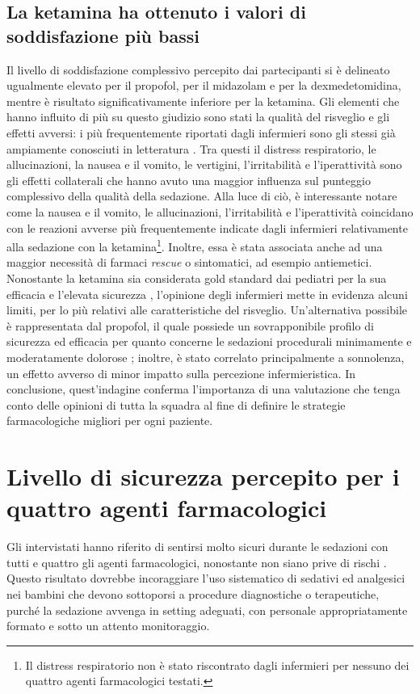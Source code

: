 \subsection*{La ketamina ha ottenuto i valori di soddisfazione più bassi}
Il livello di soddisfazione complessivo percepito dai partecipanti si è delineato ugualmente elevato per il propofol, per il midazolam e per la dexmedetomidina, mentre è risultato significativamente inferiore per la ketamina. Gli elementi che hanno influito di più su questo giudizio sono stati la qualità del risveglio e gli effetti avversi: i più frequentemente riportati dagli infermieri sono gli stessi già ampiamente conosciuti in letteratura \citep{Bellolio2016, Krauss2006}. Tra questi il distress respiratorio, le allucinazioni, la nausea e il vomito, le vertigini, l'irritabilità e l'iperattività sono gli effetti collaterali che hanno avuto una maggior influenza sul punteggio complessivo della qualità della sedazione. Alla luce di ciò, è interessante notare come la nausea e il vomito, le allucinazioni, l'irritabilità e l'iperattività coincidano con le reazioni avverse più frequentemente indicate dagli infermieri relativamente alla sedazione con la ketamina\footnote{Il distress respiratorio non è stato riscontrato dagli infermieri per nessuno dei quattro agenti farmacologici testati.}. Inoltre, essa è stata associata anche ad una maggior necessità di farmaci \emph{rescue} o sintomatici, ad esempio antiemetici.
Nonostante la ketamina sia considerata gold standard dai pediatri per la sua efficacia e l'elevata sicurezza \citep{Krauss2006}, l'opinione degli infermieri mette in evidenza alcuni limiti, per lo più relativi alle caratteristiche del risveglio. Un'alternativa possibile è rappresentata dal propofol, il quale possiede un sovrapponibile profilo di sicurezza ed efficacia per quanto concerne le sedazioni procedurali minimamente e moderatamente dolorose \citep{Vardi2002, Ferguson2016, Jalili2016}; inoltre, è stato correlato principalmente a sonnolenza, un effetto avverso di minor impatto sulla percezione infermieristica. In conclusione, quest'indagine conferma l'importanza di una valutazione che tenga conto delle opinioni di tutta la squadra al fine di definire le strategie farmacologiche migliori per ogni paziente.

\section{Livello di sicurezza percepito per i quattro agenti farmacologici}
Gli intervistati hanno riferito di sentirsi molto sicuri durante le sedazioni con tutti e quattro gli agenti farmacologici, nonostante non siano prive di rischi \citep{Bellolio2016}. Questo risultato dovrebbe incoraggiare l'uso sistematico di sedativi ed analgesici nei bambini che devono sottoporsi a procedure diagnostiche o terapeutiche, purché la sedazione avvenga in setting adeguati, con personale appropriatamente formato e sotto un attento monitoraggio. 

